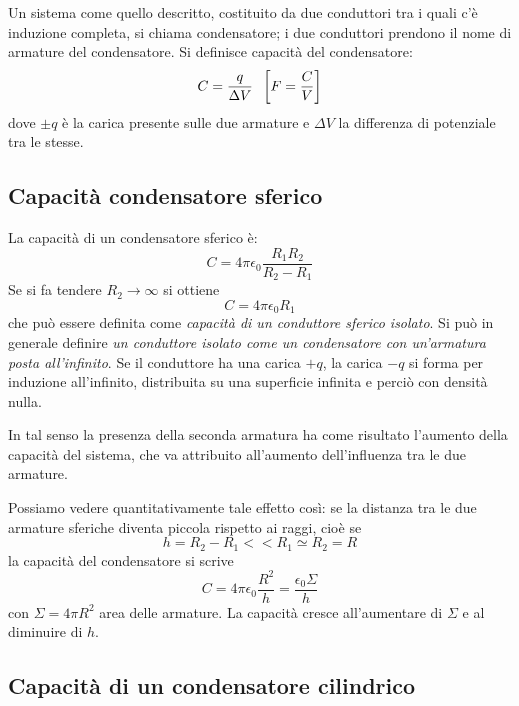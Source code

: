 \documentclass[class=book, crop=false, oneside, 12pt]{standalone}
\begin{document}
Un sistema come quello descritto, costituito da due conduttori tra i quali c'è induzione completa, si chiama condensatore; i due conduttori prendono il nome di armature del condensatore. 
Si definisce capacità del condensatore:
\begin{equation}
    C = \frac{q}{\Delta V} \hspace{0.2cm} \left[F = \frac{C}{V}\right]
\end{equation}
dove \(\pm q\) è la carica presente sulle due armature e \(\Delta V\) la differenza di potenziale tra le stesse.

\subsection{Capacità condensatore sferico}

La capacità di un condensatore sferico è:
\begin{equation}
    C = 4 \pi \epsilon_0 \frac{R_1 R_2}{R_2 - R_1}
\end{equation}
Se si fa tendere \(R_2 \rightarrow \infty\) si ottiene
\begin{equation}
    C = 4 \pi \epsilon_0 R_1
\end{equation}
che può essere definita come \emph{capacità di un conduttore sferico isolato}.
Si può in generale definire \emph{un conduttore isolato come un condensatore con un'armatura posta all'infinito}.
Se il conduttore ha una carica \(+q\), la carica \(- q\) si forma per induzione all'infinito, distribuita su una superficie infinita e perciò con densità nulla.

In tal senso la presenza della seconda armatura ha come risultato l'aumento della capacità del sistema, che va attribuito all'aumento dell'influenza tra le due armature.

Possiamo vedere quantitativamente tale effetto così: se la distanza tra le due armature sferiche diventa piccola rispetto ai raggi, cioè se 
\begin{equation*}
    h = R_2 - R_1 << R_1 \simeq R_2 = R
\end{equation*}
la capacità del condensatore si scrive
\begin{equation} \label{capacita_condensatore}
    C = 4 \pi \epsilon_0 \frac{R^2}{h} = \frac{\epsilon_0 \Sigma}{h}
\end{equation}
con \(\Sigma = 4 \pi R^2\) area delle armature. 
La capacità cresce all'aumentare di \(\Sigma\) e al diminuire di \(h\).

\subsection{Capacità di un condensatore cilindrico}
\end{document}
